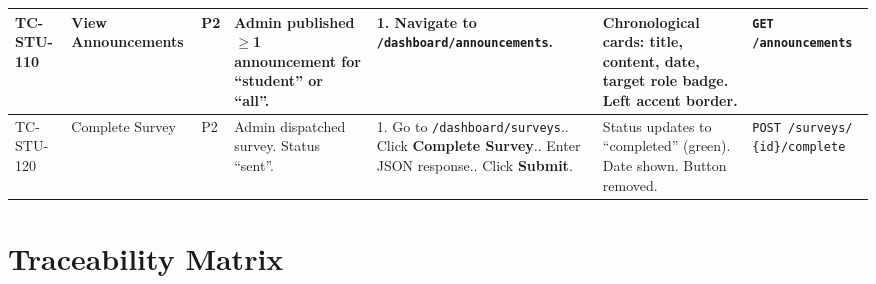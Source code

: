 \documentclass[12pt,a4paper]{article}
\begin{document}
\begin{longtable}{L{2cm} L{3cm} L{1cm} L{4cm} L{5.5cm} L{5.5cm} L{3cm}}
TC-STU-110
& View Announcements
& P2
& Admin published $\geq$1 announcement for ``student'' or ``all''.
& 1. Navigate to \texttt{/dashboard/announcements}.
& Chronological cards: title, content, date, target role badge. Left accent border.
& \texttt{GET /announcements}
\\
\midrule

TC-STU-120
& Complete Survey
& P2
& Admin dispatched survey. Status ``sent''.
& 1. Go to \texttt{/dashboard/surveys}.. Click \textbf{Complete Survey}.. Enter JSON response.. Click \textbf{Submit}.
& Status updates to ``completed'' (green). Date shown. Button removed.
& \texttt{POST /surveys/ \{id\}/complete}
\\

\end{longtable}


\section{Traceability Matrix}
\end{document}
